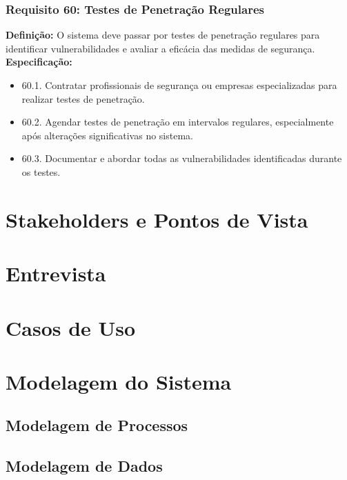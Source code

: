 \subsubsection{Requisito 60: Testes de Penetração Regulares}
\textbf{Definição:} O sistema deve passar por testes de penetração regulares para identificar vulnerabilidades e avaliar a eficácia das medidas de segurança.
\\
\textbf{Especificação:}
\begin{itemize}
	\item 60.1. Contratar profissionais de segurança ou empresas especializadas para realizar testes de penetração.
	\item 60.2. Agendar testes de penetração em intervalos regulares, especialmente após alterações significativas no sistema.
	\item 60.3. Documentar e abordar todas as vulnerabilidades identificadas durante os testes.
\end{itemize}


\section{Stakeholders e Pontos de Vista}


\section{Entrevista}


\section{ Casos de Uso}



\section{Modelagem do Sistema}


    \subsection{Modelagem de Processos}


    \subsection{Modelagem de Dados}

